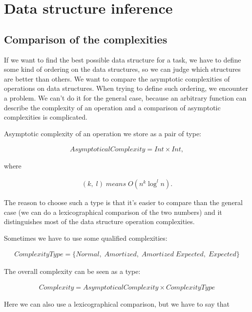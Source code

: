 \documentclass[a4paper,11pt]{article}
\begin{document}
\section{Data structure inference}

	\subsection{Comparison of the complexities}

		If we want to find the best possible data structure for a task, we have to define some kind of ordering
		on the data structures, so we can judge which structures are better than others.  We want to compare the
		asymptotic complexities of operations on data structures. When trying to define such ordering, we
		encounter a problem.  We can't do it for the general case, because an arbitrary function can describe
		the complexity of an operation and a comparison of asymptotic complexities is complicated.

		Asymptotic complexity of an operation we store as a pair of type:

		\begin{eqnarray}
			AsymptoticalComplexity = Int \times Int,
		\end{eqnarray}

		where

		\begin{eqnarray}
			(k, \; l) \; means \; O(n^k \log^l{ n}).
		\end{eqnarray}

		The reason to choose such a type is that it's easier to compare than the general case (we can do a
		lexicographical comparison of the two numbers) and it distinguishes most of the data structure operation
		complexities.

		Sometimes we have to use some qualified complexities:

		\begin{eqnarray}
			ComplexityType = \{ Normal, \; Amortized, \; Amortized \;Expected, \; Expected \}
		\end{eqnarray}

		The overall complexity can be seen as a type:

		\begin{eqnarray}
			Complexity = AsymptoticalComplexity \times ComplexityType
		\end{eqnarray}

		Here we can also use a lexicographical comparison, but we have to say that
\end{document}
